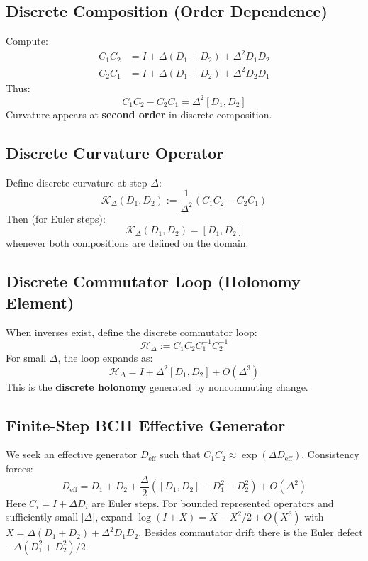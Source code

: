 \documentclass[12pt, oneside]{article}
\begin{document}
\subsection{Discrete Composition (Order Dependence)}

Compute:
\begin{align}
C_1 C_2 &= I + \Delta(D_1 + D_2) + \Delta^2 D_1 D_2 \\
C_2 C_1 &= I + \Delta(D_1 + D_2) + \Delta^2 D_2 D_1
\end{align}
Thus:
\begin{equation}
C_1 C_2 - C_2 C_1 = \Delta^2 [D_1, D_2]
\end{equation}
Curvature appears at \textbf{second order} in discrete composition.

\subsection{Discrete Curvature Operator}

Define discrete curvature at step $\Delta$:
\begin{equation}
\mathcal{K}_\Delta(D_1, D_2) := \frac{1}{\Delta^2} (C_1 C_2 - C_2 C_1)
\end{equation}
Then (for Euler steps):
\begin{equation}
\mathcal{K}_\Delta(D_1, D_2) = [D_1, D_2]
\end{equation}
whenever both compositions are defined on the domain.

\subsection{Discrete Commutator Loop (Holonomy Element)}

When inverses exist, define the discrete commutator loop:
\begin{equation}
\mathcal{H}_\Delta := C_1 C_2 C_1^{-1} C_2^{-1}
\end{equation}
For small $\Delta$, the loop expands as:
\begin{equation}
\mathcal{H}_\Delta = I + \Delta^2 [D_1, D_2] + O(\Delta^3)
\end{equation}
This is the \textbf{discrete holonomy} generated by noncommuting change.

\subsection{Finite-Step BCH Effective Generator}

We seek an effective generator $D_{\text{eff}}$ such that $C_1 C_2 \approx \exp(\Delta D_{\text{eff}})$. Consistency forces:
\begin{equation}
D_{\text{eff}} = D_1 + D_2 + \frac{\Delta}{2}([D_1, D_2]-D_1^2-D_2^2) + O(\Delta^2)
\end{equation}
Here $C_i=I+\Delta D_i$ are Euler steps. For bounded represented operators and sufficiently small $|\Delta|$, expand $\log(I+X)=X-X^2/2+O(X^3)$ with $X=\Delta(D_1+D_2)+\Delta^2D_1D_2$. Besides commutator drift there is the Euler defect $-\Delta(D_1^2+D_2^2)/2$.
\end{document}
